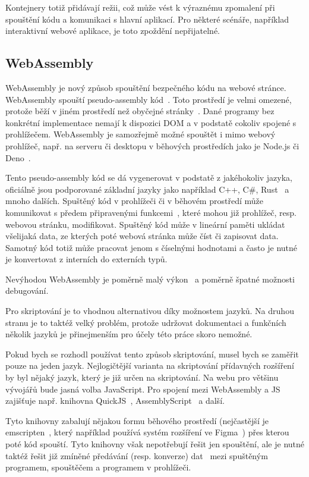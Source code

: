 Kontejnery totiž přidávají režii, což může vést k výraznému zpomalení při spouštění kódu a komunikaci s hlavní aplikací. 
Pro některé scénáře, například interaktivní webové aplikace, je toto zpoždění nepřijatelné.

\subsection{WebAssembly}\label{text:webassembly}

WebAssembly je nový způsob spouštění bezpečného kódu na webové stránce.
WebAssembly spouští pseudo-assembly kód~\cite{webassembly}.
Toto prostředí je velmi omezené, protože běží v jiném prostředí než obyčejné stránky~\cite{webassembly, figma_plugins_blog}.
Dané programy bez konkrétní implementace nemají k dispozici DOM a v podstatě cokoliv spojené s prohlížečem.
WebAssembly je samozřejmě možné spouštět i mimo webový prohlížeč, např. na serveru či desktopu v běhových prostředích jako je Node.js či Deno~\cite{webassembly}.

Tento pseudo-assembly kód se dá vygenerovat v podstatě z jakéhokoliv jazyka, oficiálně jsou podporované základní jazyky jako například C++, C\#, Rust~\cite{webassembly} a mnoho dalších.
Spuštěný kód v prohlížeči či v běhovém prostředí může komunikovat s předem připravenými funkcemi~\cite{webassembly}, které mohou již prohlížeč, resp. webovou stránku, modifikovat.
Spuštěný kód může v lineární paměti ukládat všelijaká data, ze kterých poté webová stránka může číst či zapisovat data.
Samotný kód totiž může pracovat jenom s číselnými hodnotami a často je nutné je konvertovat z interních do externích typů.

Nevýhodou WebAssembly je poměrně malý výkon~\cite{webassembly, figma_plugins_blog} a poměrně špatné možnosti debugování.

Pro skriptování je to vhodnou alternativou díky možnostem jazyků. 
Na druhou stranu je to taktéž velký problém, protože udržovat dokumentaci a funkčních několik jazyků je přinejmenším pro účely této práce skoro nemožné.

Pokud bych se rozhodl používat tento způsob skriptování, musel bych se zaměřit pouze na jeden jazyk.
Nejlogičtější varianta na skriptování přídavných rozšíření by byl nějaký jazyk, který je již určen na skriptování.
Na webu pro většinu vývojářů bude jasná volba JavaScript.
Pro spojení mezi WebAssembly a JS zajišťuje např. knihovna QuickJS~\cite{quickjs}, AssemblyScript~\cite{assemblyscript} a další.

Tyto knihovny zabalují nějakou formu běhového prostředí (nejčastější je emscripten~\cite{assemblyscript, quickjs, figma_plugins_blog}, který například používá systém rozšíření ve Figma~\cite{figma_plugins_blog}) přes kterou poté kód spouští.
Tyto knihovny však nepotřebují řešit jen spouštění, ale je nutné taktéž řešit již zmíněné předávání (resp. konverze) dat~\cite{assemblyscript} mezi spuštěným programem, spouštěčem a programem v prohlížeči.


